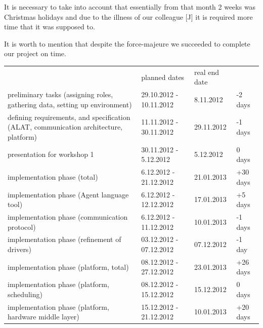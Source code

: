 \documentclass{scrreprt}
\begin{document}
It is necessary to take into account that essentially from that month 
2 weeks was Christmas holidays and due to the illness of our colleague [J]
it is required more time that it was supposed to.


It is worth to mention that despite the force-majeure we succeeded to complete 
our project on time.

\vspace{0.2in}
\begin{tabular}{|>{\raggedright}m{5cm}|l|l|l|}
\hline \multicolumn{4}{|c|}{\textbf{Planned and real dates}}\\
\hline
			&  planned dates			& real end date		& 		\\\hline
preliminary tasks (assigning roles, gathering data, setting up environment)
&  29.10.2012 - 10.11.2012		& 8.11.2012	 	& -2 days	\\\hline

defining requirements, and specification (ALAT, communication architecture, platform)
&  11.11.2012 - 30.11.2012		& 29.11.2012	 	& -1 days	\\\hline

presentation for workshop 1
&  30.11.2012 - 5.12.2012				& 5.12.2012	 	& 0 days	\\\hline

implementation phase (total)
&  6.12.2012 - 21.12.2012			& 21.01.2013	 	& +30 days	\\\hline

implementation phase (Agent language tool)
&  6.12.2012 - 12.12.2012			& 17.01.2013	 	& +5 days	\\\hline

implementation phase (communication protocol)
&  6.12.2012 - 11.12.2012			& 10.01.2013	 	& -1 days	\\\hline

implementation phase (refinement of drivers)
&  03.12.2012 - 07.12.2012			& 07.12.2012	 	& -1 day	\\\hline

implementation phase (platform, total)
&  08.12.2012 - 27.12.2012			& 23.01.2013	 	& +26 days	\\\hline

implementation phase (platform, scheduling)
&  08.12.2012 - 15.12.2012			& 15.12.2012	 	& 0 days	\\\hline

implementation phase (platform, hardware middle layer)
&  15.12.2012 - 21.12.2012			& 10.01.2013	 	& +20 days	\\\hline


\end{tabular}
\end{document}

